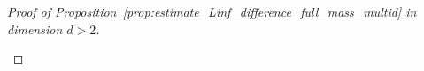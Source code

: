 \documentclass[11pt,a4paper]{article}
\numberwithin{equation}{section}
\theoremstyle{plain}
\theoremstyle{remark}
\newcommand {\f}{\frac}
\begin{document}
\begin{proof}[Proof of Proposition~\ref{prop:estimate_Linf_difference_full_mass_multid} in dimension $d>2$]
\begin{enumeratesteps}


\end{enumeratesteps}
\end{proof}
\end{document}
